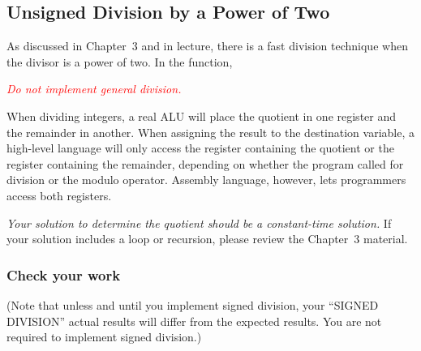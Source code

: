 \subsection{Unsigned Division by a Power of Two}

As discussed in Chapter~3 and in lecture, there is a fast division technique when the divisor is a power of two.
In the  function,
\begin{description}
\end{description}
\textcolor{red}{\textit{Do not implement general division.}}

When dividing integers, a real ALU will place the quotient in one register and the remainder in another.
When assigning the result to the destination variable, a high-level language will only access the register containing the quotient or the register containing the remainder, depending on whether the program called for division or the modulo operator.
Assembly language, however, lets programmers access both registers.

\begin{description}
\end{description}

\textit{Your solution to determine the quotient should be a constant-time solution.}
If your solution includes a loop or recursion, please review the Chapter~3 material.


\subsubsection*{Check your work}

\begin{description}
\end{description}
(Note that unless and until you implement signed division, your ``SIGNED DIVISION'' actual results will differ from the expected results.
You are not required to implement signed division.)


